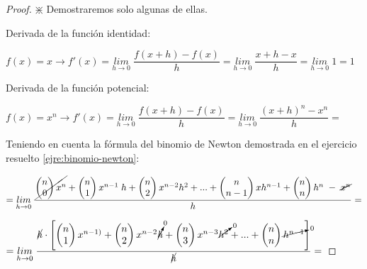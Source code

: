 	\begin{proof}   $\divideontimes$ Demostraremos solo algunas de ellas.
	
	Derivada de la función identidad:
	
	$f(x)=x \to f'(x)=\underset{h\to 0}{lim}\;{\dfrac {f(x+h)-f(x)}{h}}=\underset {h \to 0}{lim}\;{\dfrac {x+h-x}{h}}=\underset{h\to 0}{lim}\;{1}=1$
	
	\vspace{4mm}Derivada de la función potencial:
	
	$f(x)=x^n \to f'(x)=\underset {h\to 0}{lim}\;{\dfrac {f(x+h)-f(x)}{h}}=\underset{h\to 0}{lim}\;{\dfrac {(x+h)^n - x^n}{h}}=$
	
	Teniendo en cuenta la fórmula del binomio de Newton demostrada en el ejercicio resuelto \ref{ejre:binomio-newton}:
	
	$= \underset {h\to 0}{lim}\;{\dfrac { \cancel{\left( \begin{matrix} n \\ 0 \end{matrix} \right) x^n} + \left( \begin{matrix} n \\ 1 \end{matrix} \right) x^{n-1}\; h + \left( \begin{matrix} n \\ 2 \end{matrix} \right) x^{n-2} h^2 + ... + \left( \begin{matrix} n \\ n-1 \end{matrix} \right) x h^{n-1} + \left( \begin{matrix} n \\ n \end{matrix} \right) h^n \; -\; \cancel{x^n}   }{h}}=$
	
	$=\underset{h\to 0}{lim}\;{\dfrac {\cancel{h}\cdot \left[\left( \begin{matrix} n \\ 1 \end{matrix} \right) x^{n-1)} + \left( \begin{matrix} n \\ 2 \end{matrix} \right) x^{n-2} \cancelto{0}{h} + \left( \begin{matrix} n \\ 3 \end{matrix} \right) x^{n-3}\cancelto{0}{h^2} + ... + \left( \begin{matrix} n \\ n \end{matrix} \right) \cancelto{0}{h^{n-1}}   \right]}{\cancel{h}}} =$
	

\end{proof}
